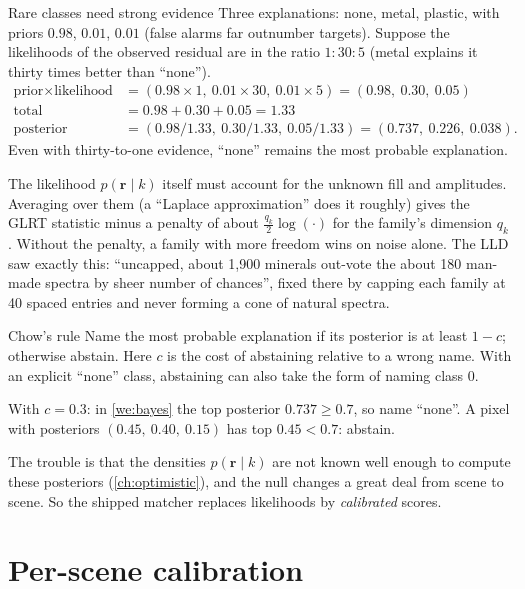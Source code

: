 \documentclass[11pt,a4paper,oneside,openany]{book}
\newcommand{\B}[1]{{\symbf{#1}}}
\newcommand{\B}[1]{{\bm{#1}}}
\newcommand{\vr}{\B{r}}
\begin{document}
\begin{worked}[label=we:bayes]{Rare classes need strong evidence}
Three explanations: none, metal, plastic, with priors $0.98$, $0.01$, $0.01$ (false alarms far outnumber targets). Suppose the likelihoods of the observed
residual are in the ratio $1:30:5$ (metal explains it thirty times better than ``none'').
\begin{align*}
\text{prior}\times\text{likelihood} &= (0.98\times1,\ 0.01\times30,\ 0.01\times5)=(0.98,\ 0.30,\ 0.05)\\
\text{total} &= 0.98+0.30+0.05=1.33\\
\text{posterior} &= (0.98/1.33,\ 0.30/1.33,\ 0.05/1.33)=(0.737,\ 0.226,\ 0.038).
\end{align*}
Even with thirty-to-one evidence, ``none'' remains the most probable explanation.
\end{worked}

The likelihood $p(\vr\mid k)$ itself must account for the unknown fill and amplitudes. Averaging over them (a ``Laplace approximation'' does it roughly) gives the GLRT
statistic minus a penalty of about $\frac{q_k}{2}\log(\cdot)$ for the family's dimension $q_k$. Without the penalty, a family with more freedom wins on noise alone. The LLD
saw exactly this: ``uncapped, about 1,900 minerals out-vote the about 180 man-made spectra by sheer number of chances'', fixed there by capping each family at 40 spaced
entries and never forming a cone of natural spectra.

\begin{defn}{Chow's rule}
Name the most probable explanation if its posterior is at least $1-c$; otherwise abstain. Here $c$ is the cost of abstaining relative to a wrong name. With an
explicit ``none'' class, abstaining can also take the form of naming class 0.
\end{defn}

With $c=0.3$: in \cref{we:bayes} the top posterior $0.737\ge0.7$, so name ``none''. A pixel with posteriors $(0.45,\ 0.40,\ 0.15)$ has top $0.45<0.7$: abstain.

The trouble is that the densities $p(\vr\mid k)$ are not known well enough to compute these posteriors (\cref{ch:optimistic}), and the null changes a great deal from scene
to scene. So the shipped matcher replaces likelihoods by \emph{calibrated} scores.

\section{Per-scene calibration}
\end{document}
